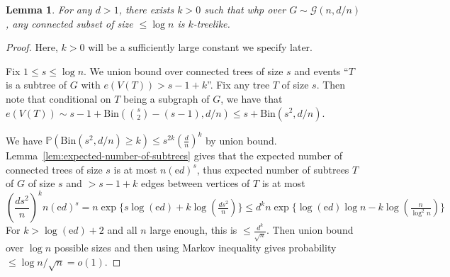 \documentclass[11pt]{article}
\theoremstyle{plain}
\newtheorem{lemma}[theorem]{Lemma}
\newcommand{\G}{\mathcal{G}}
\newcommand{\emm}{\mathrm{e}}
\renewcommand{\P}{\mathds{P}}
\newcommand{\1}{\mathbb{1}}
\newcommand{\Bin}{\text{Bin}}
\begin{document}
\begin{lemma}\label{lem:logn-sets-are-treelike}
    For any \(d > 1\), there exists \(k > 0\) such that whp over \(G\sim\G(n,d/n)\), any connected subset of size \(\leq \log n\) is \(k\)-treelike.
\end{lemma}
\begin{proof}
    Here, \(k > 0\) will be a sufficiently large constant we specify later.

    Fix \(1\leq s\leq \log n\). We union bound over connected trees of size \(s\) and events ``\(T\) is a subtree of \(G\) with \(e(V(T))>s-1+k\)''. Fix any tree \(T\) of size \(s\). Then note that conditional on \(T\) being a subgraph of \(G\), we have that \(e(V(T))\sim s-1+\Bin(\binom{s}{2}-(s-1), d/n)\leq s+\Bin(s^2,d/n)\).

    We have \(\P(\Bin(s^2, d/n) \geq k)\leq s^{2k} (\tfrac{d}{n})^k\) by union bound. Lemma~\ref{lem:expected-number-of-subtrees} gives that the expected number of connected trees of size \(s\) is at most \(n(\emm d)^s\), thus expected number of subtrees \(T\) of \(G\) of size \(s\) and \(>s-1+k\) edges between vertices of \(T\) is at most
    \[
    \left(\frac{ds^2}{n}\right)^k n(\emm d)^s = n\exp\{s\log(\emm d) + k\log(\tfrac{ds^2}{n})\} \leq d^k n\exp\{\log(\emm d)\log n - k\log(\tfrac{n}{\log^2n})\}
    \]
    For \(k > \log(\emm d) + 2\) and all \(n\) large enough, this is \(\leq \frac{d^k}{\sqrt n}\).  Then union bound over \(\log n\) possible sizes and then using Markov inequality gives probability \(\leq \log n/\sqrt n= o(1)\).
\end{proof}
\end{document}
